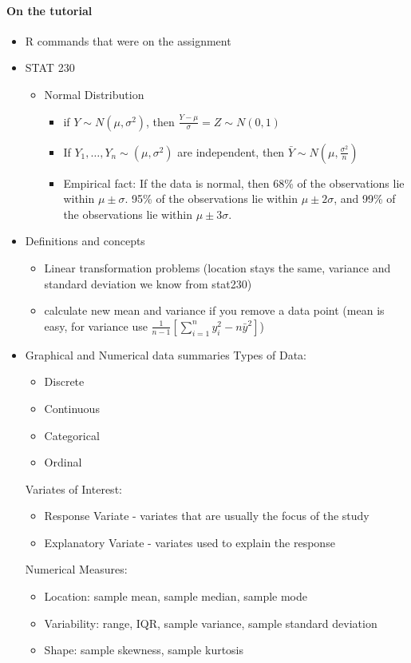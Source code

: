 \documentclass[10pt,letter]{article}
\theoremstyle{plain}
\theoremstyle{definition}
\begin{document}
\paragraph{On the tutorial}
\begin{itemize}
    \item R commands that were on the assignment
    \item STAT 230 
    \begin{itemize}
        \item Normal Distribution
        \begin{itemize}
            \item if $Y\sim N(\mu,\sigma^2)$, then $\frac{Y-\mu}{\sigma}=Z\sim N(0,1)$
            \item If $Y_1,\ldots,Y_n\sim(\mu,\sigma^2)$ are independent, then $\bar{Y}\sim N(\mu,\frac{\sigma^2}{n})$
            \item Empirical fact: If the data is normal, then 68\% of the observations lie within $\mu\pm\sigma$. 95\% of the observations lie within $\mu\pm2\sigma$, and 99\% of the observations lie within $\mu\pm3\sigma$. 
        \end{itemize}
    \end{itemize}
    \item Definitions and concepts 
    \begin{itemize}
        \item Linear transformation problems (location stays the same, variance and standard deviation we know from stat230) 
        \item calculate new mean and variance if you remove a data point (mean is easy, for variance use $\frac{1}{n-1}\left[\sum_{i=1}^ny_i^2-n\bar{y}^2\right]$)
    \end{itemize}
    \item Graphical and Numerical data summaries 
    Types of Data:
    \begin{itemize}
        \item Discrete 
        \item Continuous 
        \item Categorical 
        \item Ordinal
    \end{itemize}
    Variates of Interest: 
    \begin{itemize}
        \item Response Variate - variates that are usually the focus of the study
        \item Explanatory Variate - variates used to explain the response 
    \end{itemize}   
    Numerical Measures: 
    \begin{itemize}
        \item Location: sample mean, sample median, sample mode 
        \item Variability: range, IQR, sample variance, sample standard deviation 
        \item Shape: sample skewness, sample kurtosis 
    \end{itemize}
\end{itemize}
\end{document}
